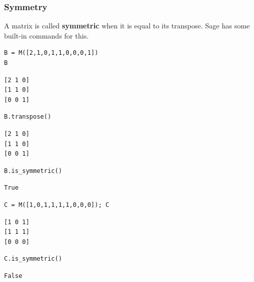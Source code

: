 \documentclass[10pt,]{book}
\newcommand{\terminology}[1]{\textbf{#1}}
\theoremstyle{plain}
\numberwithin{equation}{section}
\begin{document}
\subsubsection[Symmetry]{Symmetry}\label{subsubsection-34}

        A matrix is called \terminology{symmetric} when it is equal to its
        transpose. Sage has some built-in commands for this.
\begin{lstlisting}[style=sageinput]
B = M([2,1,0,1,1,0,0,0,1])
B
\end{lstlisting}
\begin{lstlisting}[style=sageoutput]
[2 1 0]
[1 1 0]
[0 0 1]
\end{lstlisting}
\begin{lstlisting}[style=sageinput]
B.transpose()
\end{lstlisting}
\begin{lstlisting}[style=sageoutput]
[2 1 0]
[1 1 0]
[0 0 1]
\end{lstlisting}
\begin{lstlisting}[style=sageinput]
B.is_symmetric()
\end{lstlisting}
\begin{lstlisting}[style=sageoutput]
True
\end{lstlisting}
\begin{lstlisting}[style=sageinput]
C = M([1,0,1,1,1,1,0,0,0]); C
\end{lstlisting}
\begin{lstlisting}[style=sageoutput]
[1 0 1]
[1 1 1]
[0 0 0]
\end{lstlisting}
\begin{lstlisting}[style=sageinput]
C.is_symmetric()
\end{lstlisting}
\begin{lstlisting}[style=sageoutput]
False
\end{lstlisting}
\par
\end{document}
